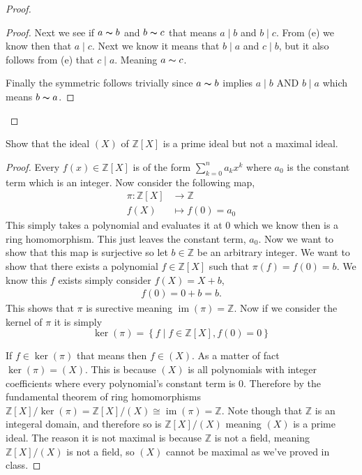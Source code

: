 \documentclass[11pt]{article}
\newenvironment{problem}[2][Problem\!]{\begin{trivlist}
\item[\hskip \labelsep {\bfseries #1}\hskip \labelsep {\bfseries #2}]}{\end{trivlist}}
\newcommand{\zz}{\mathbb Z}   %
\newcommand{\im}{\operatorname{im}} %
\newcommand{\set}[1]{\left\{#1\right\}} %
\begin{document}
\begin{proof}
\begin{itemize}
\begin{proof}
            Next we see if $a \thicksim b $ and $b \thicksim c$ that means $a\mid b$ and $b \mid c$. From (e) we know then that $a \mid c$. Next we know it means that $b \mid a$ and $c \mid b$, but it also follows from (e) that $c \mid a$. Meaning $a \thicksim c$.

            Finally the symmetric follows trivially since $a \thicksim b$ implies $a\mid b$ AND $b \mid a$ which means $b \thicksim a$.
        \end{proof} 
    \end{itemize}
\end{proof}
\newpage
\begin{tcolorbox}
    \begin{problem} {11.3}
        Show that the ideal $(X)$ of $\zz[X]$ is a prime ideal but not a maximal ideal. 
    \end{problem}
\end{tcolorbox}
\begin{proof}
    Every $f(x) \in \zz[X]$ is of the form $\sum_{k = 0}^{n}a_kx^{k}$ where $a_0$ is the constant term which is an integer. Now consider the following map,
    \begin{align*}
        \pi: \zz[X] &\to \zz \\
        f(X) &\mapsto f(0) = a_0
    \end{align*}
    This simply takes a polynomial and evaluates it at 0 which we know then is a ring homomorphism. This just leaves the constant term, $a_0$. Now we want to show that this map is surjective so let $b \in \zz$ be an arbitrary integer. We want to show that there exists a polynomial $f\in \zz[X]$ such that $\pi(f) = f(0) = b$. We know this $f$ exists simply consider $f(X) = X + b$, 
    \begin{align*}
        f(0) = 0 + b = b.     
    \end{align*}
    This shows that $\pi$ is surective meaning $\im(\pi) = \zz$.
    Now if we consider the kernel of $\pi$ it is simply \[\ker(\pi) = \set{f \mid f\in \zz[X], f(0) = 0}\]

    If $f \in \ker(\pi)$ that means then $f \in (X)$. As a matter of fact $\ker(\pi) = (X)$. This is because $(X)$ is all polynomials with integer coefficients where every polynomial's constant term is 0. Therefore by the fundamental theorem of ring homomorphisms $\zz[X]/\ker(\pi)=\zz[X]/(X) \cong \im(\pi) = \zz$. Note though that $\zz$ is an integeral domain, and therefore so is $\zz[X]/(X)$ meaning $(X)$ is a prime ideal. The reason it is not maximal is because $\zz$ is not a field, meaning $\zz[X]/(X)$ is not a field, so $(X)$ cannot be maximal as we've proved in class.
\end{proof}
\end{document}

